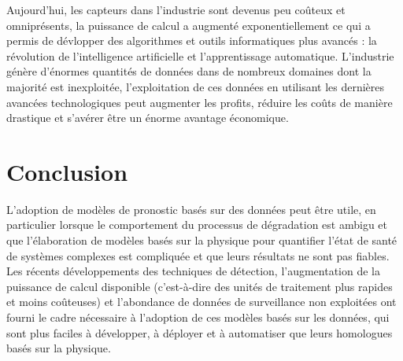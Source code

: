 Aujourd'hui, les capteurs dans l'industrie sont devenus peu coûteux et omniprésents, la puissance de calcul a augmenté exponentiellement ce qui a permis de dévlopper des algorithmes et outils informatiques plus avancés : la révolution de l'intelligence artificielle et l'apprentissage automatique. L’industrie génère d’énormes quantités de données dans de nombreux domaines dont la majorité est inexploitée, l’exploitation de ces données en utilisant les dernières avancées technologiques peut augmenter les profits, réduire les coûts de manière drastique et s’avérer être un énorme avantage économique.

\section{Conclusion}
L'adoption de modèles de pronostic basés sur des données peut être utile, en particulier lorsque le comportement du processus de dégradation est ambigu et que l'élaboration de modèles basés sur la physique pour quantifier l'état de santé de systèmes complexes est compliquée et que leurs résultats ne sont pas fiables. Les récents développements des techniques de détection, l'augmentation de la puissance de calcul disponible (c'est-à-dire des unités de traitement plus rapides et moins coûteuses) et l'abondance de données de surveillance non exploitées ont fourni le cadre nécessaire à l'adoption de ces modèles basés sur les données, qui sont plus faciles à développer, à déployer et à automatiser que leurs homologues basés sur la physique.
